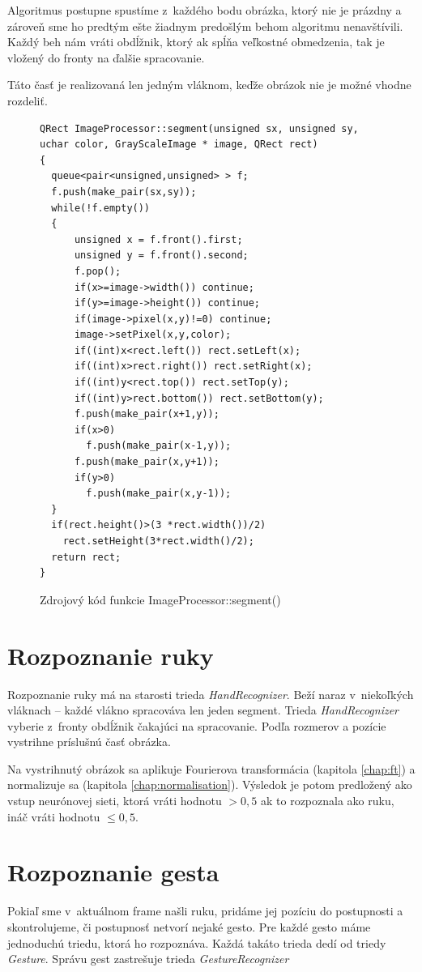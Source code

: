 Algoritmus postupne spustíme z~každého bodu obrázka, ktorý nie je prázdny a zároveň sme ho predtým ešte žiadnym predošlým behom algoritmu nenavštívili. Každý beh nám vráti obdĺžnik, ktorý ak spĺňa veľkostné obmedzenia, tak je vložený do fronty na ďalšie spracovanie. 

Táto časť je realizovaná len jedným vláknom, keďže obrázok nie je možné vhodne rozdeliť.

\begin{figure}[htp]
\begin{lstlisting}
QRect ImageProcessor::segment(unsigned sx, unsigned sy, uchar color, GrayScaleImage * image, QRect rect)
{
  queue<pair<unsigned,unsigned> > f;
  f.push(make_pair(sx,sy));
  while(!f.empty())
  {
      unsigned x = f.front().first;
      unsigned y = f.front().second;
      f.pop();
      if(x>=image->width()) continue;
      if(y>=image->height()) continue;
      if(image->pixel(x,y)!=0) continue;
      image->setPixel(x,y,color);
      if((int)x<rect.left()) rect.setLeft(x);
      if((int)x>rect.right()) rect.setRight(x);
      if((int)y<rect.top()) rect.setTop(y);
      if((int)y>rect.bottom()) rect.setBottom(y);
      f.push(make_pair(x+1,y));
      if(x>0)
        f.push(make_pair(x-1,y));
      f.push(make_pair(x,y+1));
      if(y>0)
        f.push(make_pair(x,y-1));
  }
  if(rect.height()>(3 *rect.width())/2)
    rect.setHeight(3*rect.width()/2);
  return rect;
}
\end{lstlisting}
\caption{Zdrojový kód funkcie ImageProcessor::segment()}
\label{fig:segment}
\end{figure}

\section{Rozpoznanie ruky}

Rozpoznanie ruky má na starosti trieda \textit{HandRecognizer}. Beží naraz v~niekoľkých vláknach -- každé vlákno spracováva len jeden segment.
Trieda \textit{HandRecognizer} vyberie z~fronty obdĺžnik čakajúci na spracovanie. Podľa rozmerov a pozície vystrihne príslušnú časť obrázka.

Na vystrihnutý obrázok sa aplikuje Fourierova transformácia (kapitola \ref{chap:ft}) a normalizuje sa (kapitola \ref{chap:normalisation}). Výsledok je potom predložený ako vstup neurónovej sieti, ktorá vráti hodnotu $>0,5$ ak to rozpoznala ako ruku, ináč vráti hodnotu $\leq 0,5$. 

\section{Rozpoznanie gesta}
Pokiaľ sme v~aktuálnom frame našli ruku, pridáme jej pozíciu do postupnosti a skontrolujeme, či postupnosť netvorí nejaké gesto. Pre každé gesto máme jednoduchú triedu, ktorá ho rozpoznáva. Každá takáto trieda dedí od triedy \textit{Gesture}. Správu gest zastrešuje trieda \textit{GestureRecognizer}

